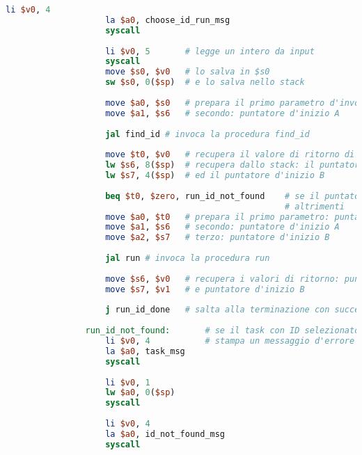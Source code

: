 \begin{center}
\begin{lstlisting}[language=mips, gobble=14, stepnumber=1]
                    li $v0, 4
                    la $a0, choose_id_run_msg
                    syscall
                    
                    li $v0, 5		# legge un intero da input
                    syscall
                    move $s0, $v0	# lo salva in $s0
                    sw $s0, 0($sp)	# e lo salva nello stack
                    
                    move $a0, $s0	# prepara il primo parametro d'invocazione: ID inserito
                    move $a1, $s6	# secondo: puntatore d'inizio A
                    
                    jal find_id	# invoca la procedura find_id
                    
                    move $t0, $v0	# recupera il valore di ritorno di find_id
                    lw $s6, 8($sp)	# recupera dallo stack: il puntatore d'inizio A
                    lw $s7, 4($sp)	# ed il puntatore d'inizio B
                    
                    beq $t0, $zero, run_id_not_found	# se il puntatore restituito da find_id è nullo, allora non c'è nessun task con l'ID inserito
                										# altrimenti
                    move $a0, $t0	# prepara il primo parametro: puntatore al task con ID selezionato
                    move $a1, $s6	# secondo: puntatore d'inizio A
                    move $a2, $s7	# terzo: puntatore d'inizio B
                    
                    jal run	# invoca la procedura run
                    
                    move $s6, $v0   # recupera i valori di ritorno: puntatore d'inizio A
                    move $s7, $v1   # e puntatore d'inizio B
                    
                    j run_id_done   # salta alla terminazione con successo della procedura
                
                run_id_not_found:       # se il task con ID selezionato non è stato trovato
                    li $v0, 4           # stampa un messaggio d'errore
                    la $a0, task_msg
                    syscall
                    
                    li $v0, 1
                    lw $a0, 0($sp)
                    syscall
                    
                    li $v0, 4
                    la $a0, id_not_found_msg
                    syscall
                    

\end{lstlisting}
\end{center}
